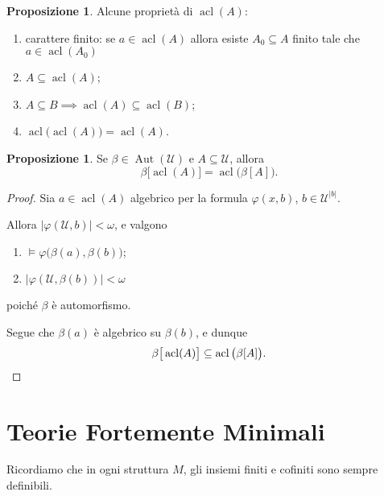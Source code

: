 \documentclass[10pt]{article}
\newcommand{\card}[1]{\left\vert #1 \right\vert}
\newcommand{\1}{\mathds{1}}
\theoremstyle{definition}%
\newtheorem{prop}[thm]{Proposizione}
\theoremstyle{plain}
\theoremstyle{remark}
\begin{document}
\begin{prop}
Alcune proprietà di \(\operatorname{acl}(A)\):
\begin{enumerate}
\item carattere finito: se \(a \in \operatorname{acl}(A)\) allora esiste \(A_{0} \subseteq A\) finito tale che \(a \in \operatorname{acl}(A_{0})\)
\item \(A \subseteq \operatorname{acl}(A)\);
\item \(A \subseteq B\implies \operatorname{acl}(A) \subseteq \operatorname{acl}(B)\);
\item \(\operatorname{acl}\big(\operatorname{acl}(A)\big)=\operatorname{acl}(A)\).
\end{enumerate}
\end{prop}

\begin{prop}
Se \(\beta \in \operatorname{Aut}(\mathcal{U})\) e \(A \subseteq \mathcal{U}\), allora
\begin{equation*}
\beta\big[\operatorname{acl}(A)\big] = \operatorname{acl}\big(\beta[A]\big).
\end{equation*}
\end{prop}
\begin{proof}
Sia \(a \in \operatorname{acl}(A)\) algebrico per la formula \(\varphi(x,b)\), \(b \in \mathcal{U}^{|b|}\).

Allora \(\card{\varphi(\mathcal{U},b)}<\omega\), e valgono
\begin{enumerate}
\item \(\vDash\varphi\big(\beta(a),\beta(b)\big)\);
\item \(\card{\varphi(\mathcal{U},\beta(b))}<\omega\)
\end{enumerate}
poiché \(\beta\) è automorfismo.

Segue che \(\beta(a)\) è algebrico su \(\beta(b)\), e dunque
\begin{equation*}
\beta\big[\operatorname{acl}(A)\big] \subseteq \operatorname{acl}\big(\beta[A]\big).\qedhere
\end{equation*}
\end{proof}
\section{Teorie Fortemente Minimali}
\label{sec:org6b65e75}

Ricordiamo che in ogni struttura \(M\), gli insiemi finiti e cofiniti sono sempre definibili.
\end{document}

